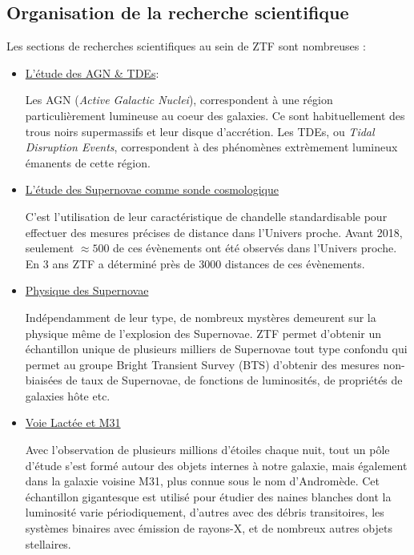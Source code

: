 \documentclass[../main/main.tex]{subfiles}
\begin{document}
\subsection{Organisation de la recherche scientifique}

Les sections de recherches scientifiques au sein de ZTF sont nombreuses \citep{GrahamZTF2019}:

\begin{itemize}[label=$\bullet$]
\setlength\itemsep{1em}
    \item \underline{L'étude des AGN \& TDEs}:
  
      Les AGN (\textit{Active Galactic Nuclei}), correspondent à une
      région particulièrement lumineuse au coeur des galaxies. Ce sont
      habituellement des trous noirs
      supermassifs et leur disque d'accrétion. Les TDEs, ou \textit{Tidal Disruption Events}, correspondent à des
      phénomènes extrèmement lumineux émanents de cette région.

    \item \underline{L'étude des Supernovae comme sonde cosmologique}
      
      C'est l'utilisation de leur caractéristique de chandelle standardisable pour
      effectuer des mesures précises de distance dans l'Univers
      proche. Avant 2018, seulement $\approx500$ de ces évènements ont
      été observés dans l'Univers proche. En 3 ans ZTF a déterminé près
      de $3000$ distances de ces évènements.

    \item \underline{Physique des Supernovae}

      Indépendamment de leur type, de nombreux mystères demeurent sur la
      physique même de l'explosion des Supernovae. ZTF permet d'obtenir
      un échantillon unique de plusieurs milliers de Supernovae tout
      type confondu qui permet au groupe Bright Transient Survey
      (BTS) d'obtenir des mesures non-biaisées de taux de Supernovae, de fonctions de
      luminosités, de propriétés de galaxies hôte etc.

    \item \underline{Voie Lactée et M31}

      Avec l'observation de plusieurs millions d'étoiles chaque nuit, tout un
      pôle d'étude s'est formé autour des objets internes à notre
      galaxie, mais également dans la galaxie voisine M31, plus connue
      sous le nom d'Andromède. Cet échantillon gigantesque est utilisé pour étudier
      des naines blanches dont la luminosité varie périodiquement,
      d'autres avec des débris transitoires, les systèmes binaires avec
      émission de rayons-X, et de nombreux autres objets stellaires.



\end{itemize}
\end{document}
